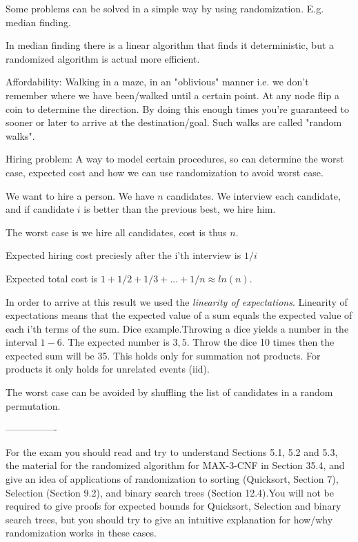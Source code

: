 \documentclass[10pt]{article}
\begin{document}
Some problems can be solved in a simple way by using randomization. E.g. median finding. 

In median finding there is a linear algorithm that finds it deterministic, but a randomized algorithm is actual more efficient.

Affordability: Walking in a maze, in an "oblivious" manner i.e. we don't remember where we have been/walked until a certain point. At any node flip a coin to determine the direction. By doing this enough times you're guaranteed to sooner or later to arrive at the destination/goal. Such walks are called "random walks". 




Hiring problem: A way to model certain procedures, so can determine the worst case, expected cost and how we can use randomization to avoid worst case.


We want to hire a person. We have $n$ candidates. We interview each candidate, and if candidate $i$ is better than the previous best, we hire him.

The worst case is we hire all candidates, cost is thus $n$.

Expected hiring cost preciesly after the i'th interview is $1/i$

Expected total cost is $1+1/2+1/3+...+1/n \approx ln(n)$.

In order to arrive at this result we used the \emph{linearity of expectations}. Linearity of expectations means that the expected value of a sum equals the expected value of each i'th terms of the sum. Dice example.Throwing a dice yields a number in the interval $1-6$. The expected number is $3,5$. Throw the dice 10 times then the expected sum will be 35. This holds only for summation not products. For products it only holds for unrelated events (iid).

The worst case can be avoided by shuffling the list of candidates in a random permutation.


----------------

For the exam you should read and try to understand Sections 5.1, 5.2 and 5.3, the material for the randomized algorithm for MAX-3-CNF in Section 35.4, and give an idea of applications of randomization to sorting (Quicksort, Section 7), Selection (Section 9.2), and binary search trees (Section 12.4).You will not be required to give proofs for expected bounds for Quicksort, Selection and binary search trees, but you should try to give an intuitive explanation for how/why randomization works in these cases.
\end{document}
